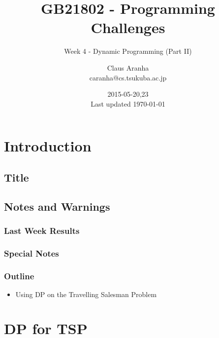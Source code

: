 \documentclass{beamer}
\title[GB21802]{GB21802 - Programming Challenges}
\subtitle[]{Week 4 - Dynamic Programming (Part II)}
\author[Claus Aranha]{Claus Aranha\\{\footnotesize caranha@cs.tsukuba.ac.jp}}
\institute{College of Information Science}
\date{2015-05-20,23\\{\tiny Last updated \today}}
\begin{document}

\section{Introduction}
\subsection{Title}
\begin{frame}
\maketitle
\end{frame}

\subsection{Notes and Warnings}

\begin{frame}
  \frametitle{Last Week Results}
\end{frame}

\begin{frame}
  \frametitle{Special Notes}
\end{frame}

\begin{frame}
  \frametitle{Outline}
  \begin{itemize}
    \item Using DP on the Travelling Salesman Problem
  \end{itemize}
\end{frame}

\section{DP for TSP}
\end{document}
